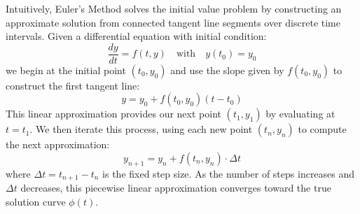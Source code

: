 \documentclass{article} %
\begin{document}
\begin{multicols}{2}
Intuitively, Euler's Method solves the initial value problem by constructing an approximate solution from connected tangent line segments over discrete time intervals. 
Given a differential equation with initial condition:
\[
    \frac{dy}{dt} = f(t, y) \quad \text{with} \quad y(t_0) = y_0
\]
we begin at the initial point $(t_0, y_0)$ and use the slope given by $f(t_0, y_0)$ to construct the first tangent line:
\[
    y = y_0 + f(t_0, y_0)(t - t_0)
\]
This linear approximation provides our next point $(t_1, y_1)$ by evaluating at $t = t_1$. We then iterate this process, using each new point $(t_n, y_n)$ to compute the next approximation:
\[
    y_{n+1} = y_n + f(t_n, y_n) \cdot \Delta t
\]
where $\Delta t = t_{n+1} - t_n$ is the fixed step size. 
As the number of steps increases and $\Delta t$ decreases, this piecewise linear approximation converges toward the true solution curve $\phi(t)$.

\label{last_page}

\newpage



\end{multicols}

\newpage
\appendix
\end{document}
